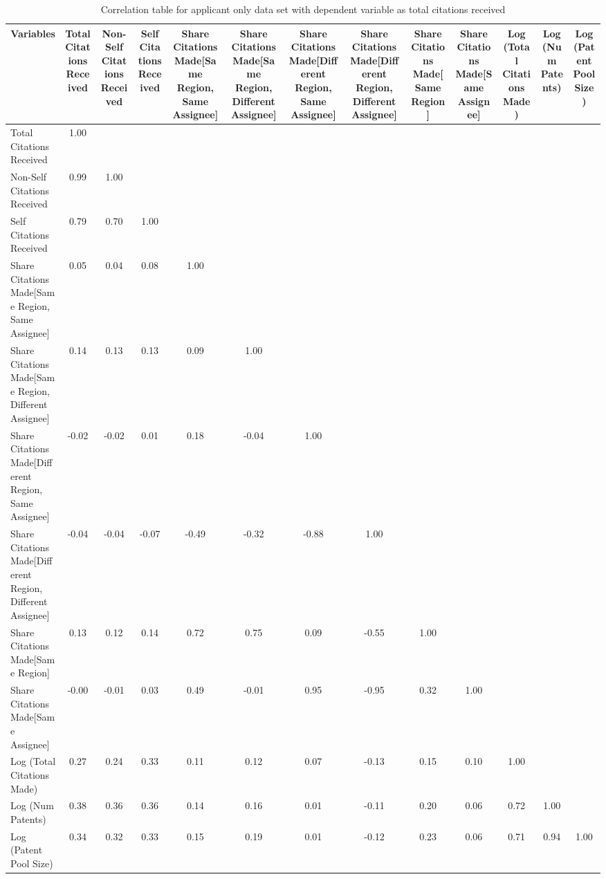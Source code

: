 \begin{table}[htbp]\centering \caption{Correlation table for applicant only data set with dependent variable as total citations received \label{a.tcorrelation}}
\begin{tabular}{l  c  c  c  c  c  c  c  c  c  c  c  c }\hline\hline
\multicolumn{1}{c}{Variables} &Total Citations Received&Non-Self Citations Received&Self Citations Received&Share Citations Made[Same Region, Same Assignee]&Share Citations Made[Same Region, Different Assignee]&Share Citations Made[Different Region, Same Assignee]&Share Citations Made[Different Region, Different Assignee]&Share Citations Made[Same Region]&Share Citations Made[Same Assignee]&Log (Total Citations Made)&Log (Num Patents)&Log (Patent Pool Size)\\ \hline
Total Citations Received&1.00\\
Non-Self Citations Received&0.99&1.00\\
Self Citations Received&0.79&0.70&1.00\\
Share Citations Made[Same Region, Same Assignee]&0.05&0.04&0.08&1.00\\
Share Citations Made[Same Region, Different Assignee]&0.14&0.13&0.13&0.09&1.00\\
Share Citations Made[Different Region, Same Assignee]&-0.02&-0.02&0.01&0.18&-0.04&1.00\\
Share Citations Made[Different Region, Different Assignee]&-0.04&-0.04&-0.07&-0.49&-0.32&-0.88&1.00\\
Share Citations Made[Same Region]&0.13&0.12&0.14&0.72&0.75&0.09&-0.55&1.00\\
Share Citations Made[Same Assignee]&-0.00&-0.01&0.03&0.49&-0.01&0.95&-0.95&0.32&1.00\\
Log (Total Citations Made)&0.27&0.24&0.33&0.11&0.12&0.07&-0.13&0.15&0.10&1.00\\
Log (Num Patents)&0.38&0.36&0.36&0.14&0.16&0.01&-0.11&0.20&0.06&0.72&1.00\\
Log (Patent Pool Size)&0.34&0.32&0.33&0.15&0.19&0.01&-0.12&0.23&0.06&0.71&0.94&1.00\\
\hline \hline 
 \end{tabular}
\end{table}
